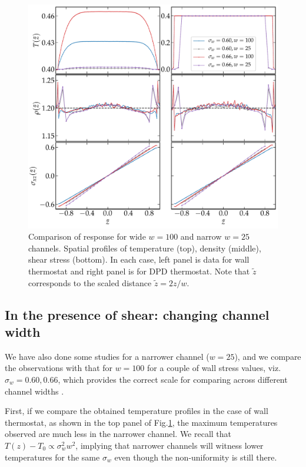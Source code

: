 \begin{figure}
\centering
\includegraphics[width=15cm]{figs/cw1.pdf}
\caption[{\em Comparison of response for wide $w=100$ and narrow $w=25$ channels: spatial profiles of temperature, density, shear stress}]{Comparison of response for wide $w=100$ and narrow $w=25$ channels. Spatial profiles of temperature (top), density (middle), shear stress (bottom). In each case, left panel is data
for wall thermostat and right panel is for DPD thermostat. Note that $\tilde{z}$ corresponds to the scaled distance $\tilde{z}=2z/w$.}
\label{narrow1}
\end{figure}

\subsection{In the presence of shear: changing channel width}

We have also done some studies for a narrower channel ($w=25$), and we compare the observations with that for $w=100$ for a couple of wall stress values, viz. $\sigma_w=0.60, 0.66$, which provides the correct scale for comparing across different channel widths \cite{mansard2013molecular}.

First, if we compare the obtained temperature profiles in the case of wall thermostat, as shown in the top panel of Fig.\ref{narrow1}, the maximum temperatures observed are much less in the narrower channel. We recall that $T(z) - T_0 \propto \sigma_w^2w^2$, implying that narrower channels will witness lower temperatures for the same $\sigma_w$ even though the non-uniformity is still there. 

